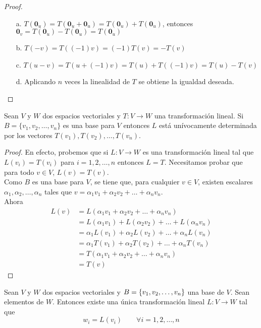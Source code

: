 \begin{proof}
\begin{itemize}
\item[a. ] $T(\mathbf{0}_u) = T(\mathbf{0}_u + \mathbf{0}_u) = T(\mathbf{0}_u) + T(\mathbf{0}_u)$, entonces $\mathbf{0}_v = T(\mathbf{0}_u)- T(\mathbf{0}_u) = T(\mathbf{0}_u)$
\item[b. ] $T(-v) = T((-1)v) = (-1) T(v) = -T(v)$
\item [c. ] $T(u-v) = T(u+(-1)v) = T(u) + T((-1)v) = T(u) - T(v)$
\item [d. ] Aplicando $n$ veces la linealidad de $T$ se obtiene la igualdad deseada.
\end{itemize}
\end{proof}

\begin{theorem}
Sean $V$ y $W$ dos espacios vectoriales y $T: V \to W$ una transformación lineal. Si $B = \{v_1, v_2, \ldots , v_n\}$ es una base para $V$ entonces $L$ está unívocamente determinada por los vectores $T(v_1), T(v_2), \ldots , T(v_n)$.
\end{theorem}

\begin{proof}
En efecto, probemos que si $L: V \to W$ es una transformación lineal tal que $L(v_i) = T(v_i)$ para $i = 1, 2, \ldots , n$ entonces $L = T$. Necesitamos probar que para todo $v \in V$, $L(v) = T(v)$.
\\

Como $B$ es una base para $V$, se tiene que, para cualquier $v \in V$, existen escalares $\alpha_1, \alpha_2, \ldots , \alpha_n$ tales que $v = \alpha_1 v_1 + \alpha_2 v_2 + \ldots + \alpha_n v_n$.\\

Ahora
\begin{align*}
L(v) &= L(\alpha_1 v_1 + \alpha_2 v_2 + \ldots + \alpha_n v_n)\\
&= L(\alpha_1 v_1) + L(\alpha_2 v_2) + \ldots + L(\alpha_n v_n)\\
&=\alpha_1 L(v_1) + \alpha_2 L(v_2) + \ldots + \alpha_n L(v_n)\\ 
&=\alpha_1 T(v_1) + \alpha_2 T(v_2) + \ldots + \alpha_n T(v_n)\\
&= T(\alpha_1 v_1 + \alpha_2 v_2 + \ldots + \alpha_n v_n)\\
&= T(v) 
\end{align*}
\end{proof}

\begin{theorem}
Sean $V$ y $W$ dos espacios vectoriales y $B =  \lbrace v_1, v_2, \ldots, v_n \rbrace$ una base de $V$. Sean  elementos de $W$. Entonces existe una única transformación lineal $L: V \to W$ tal que 
$$w_i = L(v_i)\qquad \forall i = 1, 2, \ldots, n$$
\end{theorem}

